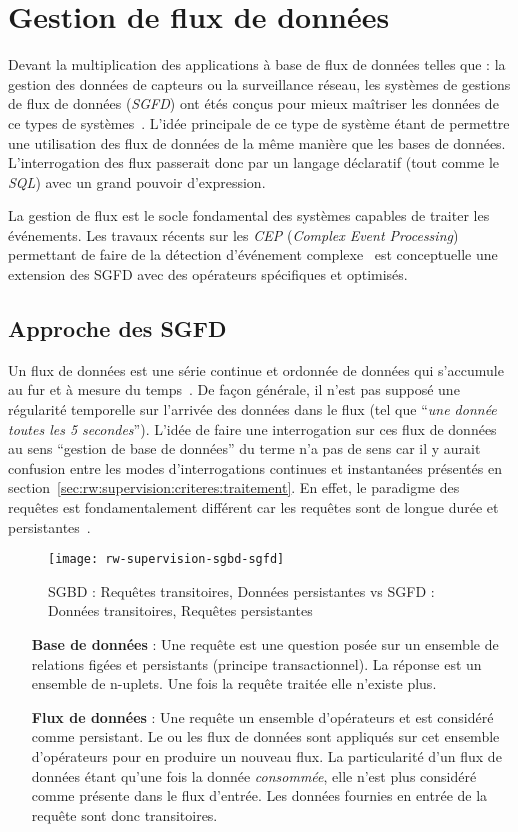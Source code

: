 \section{Gestion de flux de données}\label{sec:rw:supervision:datastream}
Devant la multiplication des applications à base de flux de données telles que : la gestion des données de capteurs ou la surveillance réseau, les systèmes de gestions de flux de données (\textit{SGFD}) ont étés conçus pour mieux maîtriser les données de ce types de systèmes~\cite{Madden:tag, Yao:cougar, Cranor:gigascope}. L'idée principale de ce type de système étant de permettre une utilisation des flux de données de la même manière que les bases de données. L'interrogation des flux passerait donc par un langage déclaratif (tout comme le \textit{SQL}) avec un grand pouvoir d'expression.

La gestion de flux est le socle fondamental des systèmes capables de traiter les événements. Les travaux récents sur les \textit{CEP} (\textit{Complex Event Processing}) permettant de faire de la détection d'événement complexe~\cite{Brenna:cayuga} est conceptuelle une extension des SGFD avec des opérateurs spécifiques et optimisés.
\subsection{Approche des SGFD}
Un flux de données est une série continue et ordonnée de données qui s'accumule au fur et à mesure du temps~\cite{Golab:issues}. De façon générale, il n'est pas supposé une régularité temporelle sur l'arrivée des données dans le flux (tel que \enquote{\it une donnée toutes les 5 secondes}). L'idée de faire une interrogation sur ces flux de données au sens \enquote{gestion de base de données} du terme n'a pas de sens car il y aurait confusion entre les modes d'interrogations continues et instantanées présentés en section~\ref{sec:rw:supervision:criteres:traitement}. En effet, le paradigme des requêtes est fondamentalement différent car les requêtes sont de longue durée et persistantes~\cite{Chen:niagaracq}.
\begin{figure}[ht]
    \centering
    \texttt{[image: rw-supervision-sgbd-sgfd]}
    \caption{SGBD : Requêtes transitoires, Données persistantes vs SGFD : Données transitoires, Requêtes persistantes~\cite{Gurgen:sstreamware}}
\end{figure}

\begin{itemize}
    \item[\textbf{Base de données}] : Une requête est une question posée sur un ensemble de relations figées et persistants (principe transactionnel). La réponse est un ensemble de n-uplets. Une fois la requête traitée elle n'existe plus.
    \item[\textbf{Flux de données}] : Une requête un ensemble d'opérateurs et est considéré comme persistant. Le ou les flux de données sont appliqués sur cet ensemble d'opérateurs pour en produire un nouveau flux. La particularité d'un flux de données étant qu'une fois la donnée \textit{consommée}, elle n'est plus considéré comme présente dans le flux d'entrée. Les données fournies en entrée de la requête sont donc transitoires.
\end{itemize}

